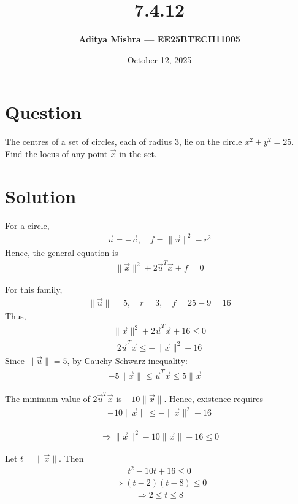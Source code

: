 \documentclass[a4paper,12pt]{article}
\title{\textbf{7.4.12}}
\author{\textbf{Aditya Mishra — EE25BTECH11005}}
\date{October 12, 2025}
\begin{document}
\maketitle

\section*{Question}
The centres of a set of circles, each of radius \(3\), lie on the circle \(x^2 + y^2 = 25\).  
Find the locus of any point \(\vec{x}\) in the set.

\section*{Solution}

For a circle,
\begin{align}
\vec{u} = -\vec{c}, \quad f = \|\vec{u}\|^2 - r^2
\end{align}
Hence, the general equation is
\begin{align}
\|\vec{x}\|^2 + 2\vec{u}^T\vec{x} + f = 0
\end{align}

For this family,
\begin{align}
\|\vec{u}\| = 5, \quad r = 3, \quad f = 25 - 9 = 16
\end{align}
Thus,
\begin{align}
\|\vec{x}\|^2 + 2\vec{u}^T\vec{x} + 16 \le 0
\end{align}
\begin{align}
2\vec{u}^T\vec{x} \le -\|\vec{x}\|^2 - 16
\end{align}
Since \(\|\vec{u}\| = 5\), by Cauchy-Schwarz inequality:
\begin{align}
-5\|\vec{x}\| \le \vec{u}^T\vec{x} \le 5\|\vec{x}\|
\end{align}

The minimum value of \(2\vec{u}^T\vec{x}\) is \(-10\|\vec{x}\|\).  
Hence, existence requires
\begin{align}
-10\|\vec{x}\| \le -\|\vec{x}\|^2 - 16
\end{align}

\begin{align}
\Rightarrow \|\vec{x}\|^2 - 10\|\vec{x}\| + 16 \le 0
\end{align}

Let \(t = \|\vec{x}\|\). Then
\begin{align}
t^2 - 10t + 16 \le 0
\end{align}
\begin{align}
\Rightarrow (t - 2)(t - 8) \le 0
\end{align}
\begin{align}
\Rightarrow 2 \le t \le 8
\end{align}
\end{document}

